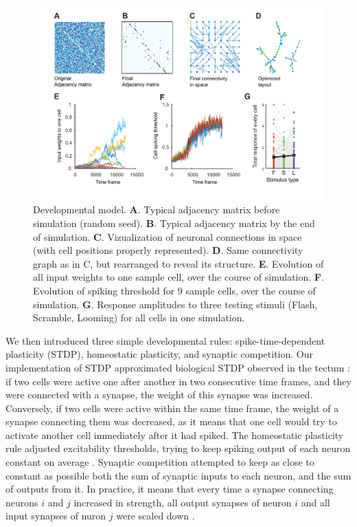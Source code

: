 \documentclass{article}
\begin{document}
\begin{figure}[!t]
\includegraphics[width=\linewidth]{fig7.pdf}
\caption{
Developmental model. \textbf{A}. Typical adjacency matrix before simulation (random seed). \textbf{B}. Typical adjacency matrix by the end of simulation. \textbf{C}. Vizualization of neuronal connections in space (with cell positions properly represented). \textbf{D}. Same connectivity graph as in C, but rearranged to reveal its structure. \textbf{E}. Evolution of all input weights to one sample cell, over the course of simulation. \textbf{F}. Evolution of spiking threshold for 9 sample cells, over the course of simulation. \textbf{G}. Response amplitudes to three testing stimuli (Flash, Scramble, Looming) for all cells in one simulation. }
\end{figure}

We then introduced three simple developmental rules: spike-time-dependent plasticity (STDP), homeostatic plasticity, and synaptic competition. Our implementation of STDP approximated biological STDP observed in the tectum \citep{zhang1998stdp,mu2006stdp}: if two cells were active one after another in two consecutive time frames, and they were connected with a synapse, the weight of this synapse was increased. Conversely, if two cells were active within the same time frame, the weight of a synapse connecting them was decreased, as it means that one cell would try to activate another cell immediately after it had spiked. The homeostatic plasticity rule adjusted excitability thresholds, trying to keep spiking output of each neuron constant on average \citep{pratt2007intrinsic,turrigiano2011}. Synaptic competition attempted to keep as close to constant as possible both the sum of synaptic inputs to each neuron, and the sum of outputs from it. In practice, it means that every time a synapse connecting neurons $i$ and $j$ increased in strength, all output synapses of neuron $i$ and all input synapses of nuron $j$ were scaled down \citep{hamodi2016nmda,cohen2002synreview,munz2014hebbian}.
\end{document}
